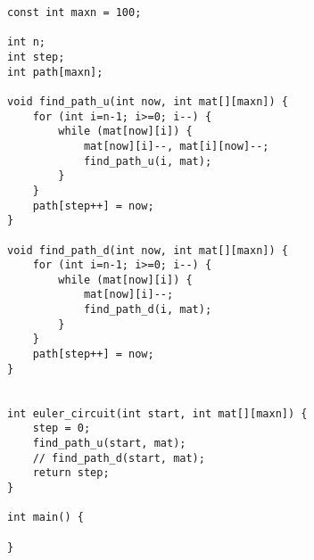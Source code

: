 \begin{lstlisting}
const int maxn = 100;

int n;
int step;
int path[maxn];

void find_path_u(int now, int mat[][maxn]) {
	for (int i=n-1; i>=0; i--) {
		while (mat[now][i]) {
			mat[now][i]--, mat[i][now]--; 
			find_path_u(i, mat); 
		}
	}
	path[step++] = now; 
}

void find_path_d(int now, int mat[][maxn]) {  
	for (int i=n-1; i>=0; i--) {
		while (mat[now][i]) { 
			mat[now][i]--; 
			find_path_d(i, mat); 
		} 
	}
	path[step++] = now; 
}


int euler_circuit(int start, int mat[][maxn]) { 
	step = 0;
	find_path_u(start, mat); 
	// find_path_d(start, mat); 
	return step; 
}

int main() {
	
}
\end{lstlisting}